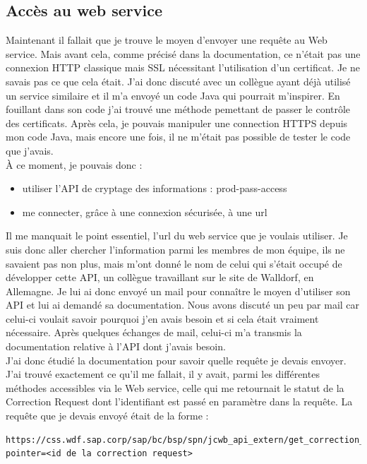 \subsection{Accès au web service}
Maintenant il fallait que je trouve le moyen d'envoyer une requête au \gls{Web service}. Mais avant cela, comme précisé dans la documentation, ce n'était pas une connexion HTTP classique mais SSL nécessitant l'utilisation d'un certificat. Je ne savais pas ce que cela était. J'ai donc discuté avec un collègue ayant déjà utilisé un service similaire et il m'a envoyé un code \gls{Java} qui pourrait m'inspirer. En fouillant dans son code j'ai trouvé une méthode pemettant de passer le contrôle des certificats. Après cela, je pouvais manipuler une connection HTTPS depuis mon code \gls{Java}, mais encore une fois, il ne m'était pas possible de tester le code que j'avais.\\
\`{A} ce moment, je pouvais donc :
\begin{itemize}
	\item utiliser l'API de cryptage des informations : prod-pass-access
	\item me connecter, grâce à une connexion sécurisée, à une url
\end{itemize}
Il me manquait le point essentiel, l'url du web service que je voulais utiliser. Je suis donc aller chercher l'information parmi les membres de mon équipe, ils ne savaient pas non plus, mais m'ont donné le nom de celui qui s'était occupé de développer cette API, un collègue travaillant sur le site de Walldorf, en Allemagne. Je lui ai donc envoyé un mail pour conna\^{i}tre le moyen d'utiliser son API et lui ai demandé sa documentation. Nous avons discuté un peu par mail car celui-ci voulait savoir pourquoi j'en avais besoin et si cela était vraiment nécessaire. Après quelques échanges de mail, celui-ci m'a transmis la documentation relative à l'API dont j'avais besoin.\\
J'ai donc étudié la documentation pour savoir quelle requête je devais envoyer.\\
J'ai trouvé exactement ce qu'il me fallait, il y avait, parmi les différentes méthodes accessibles via le \gls{Web service}, celle qui me retournait le statut de la Correction Request dont l'identifiant est passé en paramètre dans la requête. La requête que je devais envoyé était de la forme :
\begin{lstlisting}
https://css.wdf.sap.corp/sap/bc/bsp/spn/jcwb_api_extern/get_correction_requests?pointer=<id de la correction request>
\end{lstlisting}


